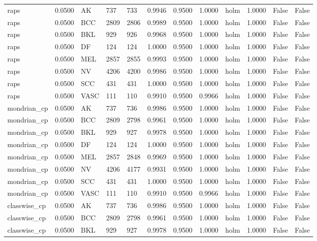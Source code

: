 \begin{table}[htbp]
\begin{tabular}{llllllllllll}
raps & 0.0500 & AK & 737 & 733 & 0.9946 & 0.9500 & 1.0000 & holm & 1.0000 & False & False \\
raps & 0.0500 & BCC & 2809 & 2806 & 0.9989 & 0.9500 & 1.0000 & holm & 1.0000 & False & False \\
raps & 0.0500 & BKL & 929 & 926 & 0.9968 & 0.9500 & 1.0000 & holm & 1.0000 & False & False \\
raps & 0.0500 & DF & 124 & 124 & 1.0000 & 0.9500 & 1.0000 & holm & 1.0000 & False & False \\
raps & 0.0500 & MEL & 2857 & 2855 & 0.9993 & 0.9500 & 1.0000 & holm & 1.0000 & False & False \\
raps & 0.0500 & NV & 4206 & 4200 & 0.9986 & 0.9500 & 1.0000 & holm & 1.0000 & False & False \\
raps & 0.0500 & SCC & 431 & 431 & 1.0000 & 0.9500 & 1.0000 & holm & 1.0000 & False & False \\
raps & 0.0500 & VASC & 111 & 110 & 0.9910 & 0.9500 & 0.9966 & holm & 1.0000 & False & False \\
mondrian\_cp & 0.0500 & AK & 737 & 736 & 0.9986 & 0.9500 & 1.0000 & holm & 1.0000 & False & False \\
mondrian\_cp & 0.0500 & BCC & 2809 & 2798 & 0.9961 & 0.9500 & 1.0000 & holm & 1.0000 & False & False \\
mondrian\_cp & 0.0500 & BKL & 929 & 927 & 0.9978 & 0.9500 & 1.0000 & holm & 1.0000 & False & False \\
mondrian\_cp & 0.0500 & DF & 124 & 124 & 1.0000 & 0.9500 & 1.0000 & holm & 1.0000 & False & False \\
mondrian\_cp & 0.0500 & MEL & 2857 & 2848 & 0.9969 & 0.9500 & 1.0000 & holm & 1.0000 & False & False \\
mondrian\_cp & 0.0500 & NV & 4206 & 4177 & 0.9931 & 0.9500 & 1.0000 & holm & 1.0000 & False & False \\
mondrian\_cp & 0.0500 & SCC & 431 & 431 & 1.0000 & 0.9500 & 1.0000 & holm & 1.0000 & False & False \\
mondrian\_cp & 0.0500 & VASC & 111 & 110 & 0.9910 & 0.9500 & 0.9966 & holm & 1.0000 & False & False \\
classwise\_cp & 0.0500 & AK & 737 & 736 & 0.9986 & 0.9500 & 1.0000 & holm & 1.0000 & False & False \\
classwise\_cp & 0.0500 & BCC & 2809 & 2798 & 0.9961 & 0.9500 & 1.0000 & holm & 1.0000 & False & False \\
classwise\_cp & 0.0500 & BKL & 929 & 927 & 0.9978 & 0.9500 & 1.0000 & holm & 1.0000 & False & False \\

\end{tabular}
\end{table}
